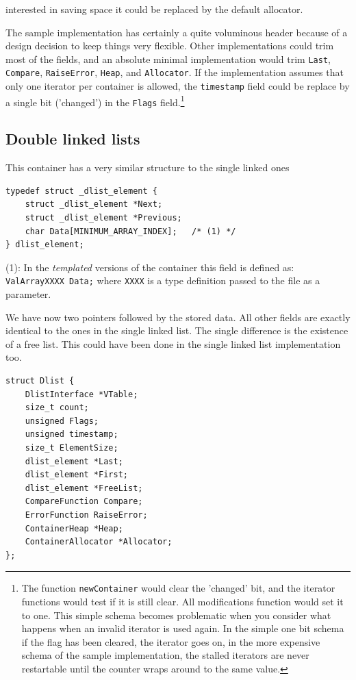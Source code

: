 \documentclass[12pt,a4paper,openany]{memoir} %
\begin{document}
{{\begin{enumerate}
interested in saving space it could be replaced by the default allocator.
\end{enumerate}
The sample implementation has certainly a quite voluminous header because of a design decision to keep things very flexible. Other implementations 
could trim most of the fields, and an absolute minimal implementation would trim \texttt{Last}, \texttt{Compare}, \texttt{RaiseError}, \texttt{Heap}, 
and \texttt{Allocator}. If the implementation assumes that only one iterator per container is allowed, the \texttt{timestamp} field could be replace by 
a single bit ('changed') in the \texttt{Flags} field.\footnote{The function \texttt{newContainer} would clear the 'changed' bit, and the iterator 
functions would test if it is still clear. All modifications function would set it to one. This simple schema becomes problematic when you consider 
what happens when an invalid iterator is used again. In the simple one bit schema if the flag has been cleared, the iterator goes on, in the more 
expensive schema of the sample  implementation, the stalled iterators are never restartable until the counter wraps around to the same value.}
\subsection{Double linked lists}
This container has a very similar structure to the single linked ones
\begin{verbatim}
typedef struct _dlist_element {
    struct _dlist_element *Next;
	struct _dlist_element *Previous;
    char Data[MINIMUM_ARRAY_INDEX];   /* (1) */
} dlist_element;
\end{verbatim}

(1): In the \textsl{templated} versions of the container this field is defined as: \verb,ValArrayXXXX Data;, where \verb,XXXX, is a type 
definition passed to the file as a parameter.

We have now two pointers followed by the stored data. All other fields are exactly identical to the ones in the single linked list. The single 
difference is the existence of a free list. This could have been done in the single linked list implementation too.
\begin{verbatim}
struct Dlist {
    DlistInterface *VTable;
    size_t count;        
    unsigned Flags;
    unsigned timestamp;
    size_t ElementSize;
    dlist_element *Last; 
    dlist_element *First;
    dlist_element *FreeList;
    CompareFunction Compare;
    ErrorFunction RaiseError; 
    ContainerHeap *Heap;
    ContainerAllocator *Allocator;
};
\end{verbatim}

}}
\end{document}
